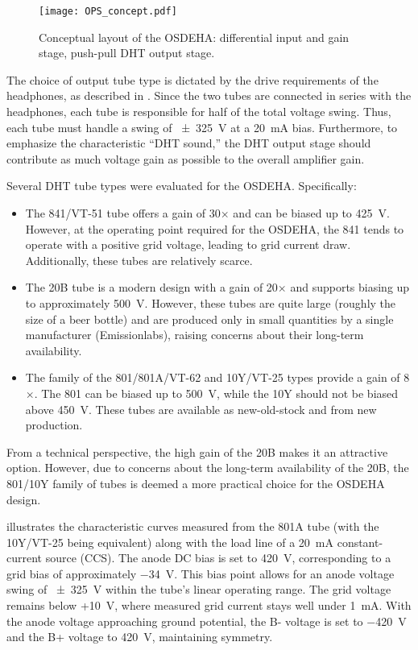 \begin{figure}
\begin{center}
\texttt{[image: OPS\_concept.pdf]}
\caption{Conceptual layout of the OSDEHA: differential input and gain stage, push-pull DHT output stage.}
\end{center}
\end{figure}

The choice of output tube type is dictated by the drive requirements of the headphones, as described in . Since the two tubes are connected in series with the headphones, each tube is responsible for half of the total voltage swing. Thus, each tube must handle a swing of \SI{\pm325}{V} at a \SI{20}{mA} bias. Furthermore, to emphasize the characteristic ``DHT sound,'' the DHT output stage should contribute as much voltage gain as possible to the overall amplifier gain.

Several DHT tube types were evaluated for the OSDEHA\cite{osdeha_p9,osdeha_whichDHT}. Specifically:

\begin{itemize}
\item The 841/VT-51 tube offers a gain of 30$\times$ and can be biased up to \SI{425}{V}. However, at the operating point required for the OSDEHA, the 841 tends to operate with a positive grid voltage, leading to grid current draw. Additionally, these tubes are relatively scarce.
\item The 20B tube is a modern design with a gain of 20$\times$ and supports biasing up to approximately \SI{500}{V}. However, these tubes are quite large (roughly the size of a beer bottle) and are produced only in small quantities by a single manufacturer (Emissionlabs), raising concerns about their long-term availability.
\item The family of the 801/801A/VT-62 and 10Y/VT-25 types\cite{aasyl_801types} provide a gain of 8$\times$. The 801 can be biased up to \SI{500}{V}, while the 10Y should not be biased above \SI{450}{V}. These tubes are available as new-old-stock and from new production.
\end{itemize}

From a technical perspective, the high gain of the 20B makes it an attractive option. However, due to concerns about the long-term availability of the 20B, the 801/10Y family of tubes is deemed a more practical choice for the OSDEHA design.

 illustrates the characteristic curves measured from the 801A tube (with the 10Y/VT-25 being equivalent) along with the load line of a \SI{20}{mA} constant-current source (CCS). The anode DC bias is set to \SI{420}{V}, corresponding to a grid bias of approximately \SI{-34}{V}. This bias point allows for an anode voltage swing of \SI{\pm325}{V} within the tube's linear operating range. The grid voltage remains below +\SI{10}{V}, where measured grid current stays well under \SI{1}{mA}. With the anode voltage approaching ground potential, the B- voltage is set to \SI{-420}{V} and the B+ voltage to \SI{+420}{V}, maintaining symmetry.

